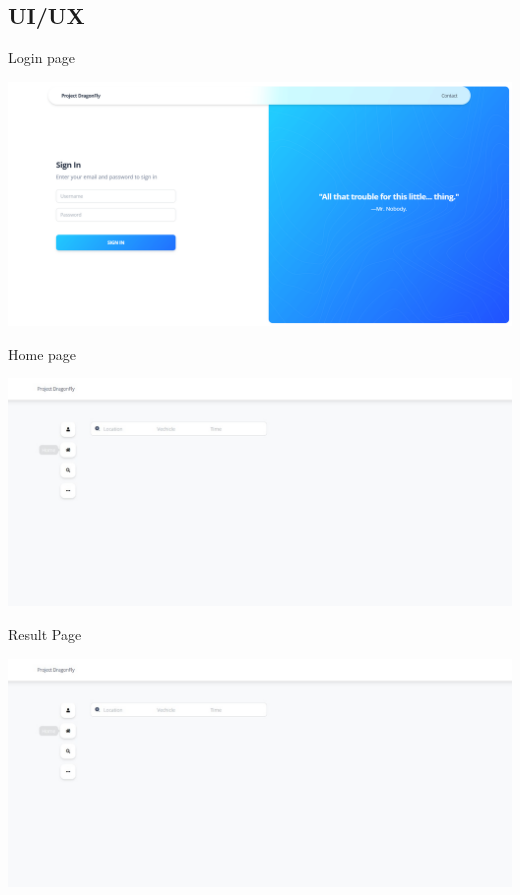 \documentclass{beamer}
\begin{document}
	\subsection{UI/UX}	
	\begin{frame}{Login page}
		\begin{center}
			\includegraphics[width=1\linewidth]{res/loginpage.png}
		\end{center}
	\end{frame}

	\begin{frame}{Home page}
		\begin{center}
			\includegraphics[width=1\linewidth]{res/homepage}
		\end{center}
	\end{frame}

	\begin{frame}{Result Page}
		\begin{center}
			\includegraphics[width=1\linewidth]{res/homepage}
		\end{center}
	\end{frame}
\end{document}
